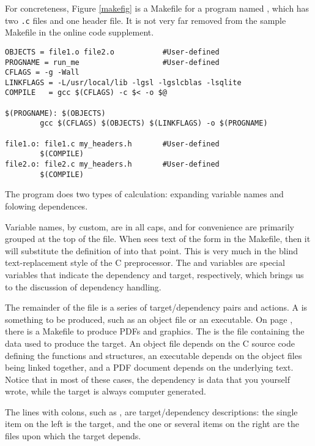 For concreteness, 
Figure \ref{makefig} is a Makefile for a program named ,
which has two {\tt .c} files and one header file. It is not very far
removed from the sample Makefile in the online code supplement.

\begin{figure*}
\begin{verbatim}
OBJECTS = file1.o file2.o           #User-defined
PROGNAME = run_me                   #User-defined
CFLAGS = -g -Wall
LINKFLAGS = -L/usr/local/lib -lgsl -lgslcblas -lsqlite
COMPILE   = gcc $(CFLAGS) -c $< -o $@

$(PROGNAME): $(OBJECTS)
        gcc $(CFLAGS) $(OBJECTS) $(LINKFLAGS) -o $(PROGNAME)

file1.o: file1.c my_headers.h       #User-defined
        $(COMPILE)
file2.o: file2.c my_headers.h       #User-defined
        $(COMPILE)
\end{verbatim}
\caption{A sample Makefile for a program with two source files.}
\label{makefig}
\end{figure*}

The  program does two types of calculation: expanding variable
names and folowing dependences. 

Variable names, by custom, are in all caps, and for convenience are
primarily grouped at the top of the file. When  sees text of
the form  in the Makefile, then it will substitute the
definition of  into that point. This is very much in the
blind text-replacement style of the C preprocessor. The \ci{\$<} and
 variables are special variables that indicate the dependency
and target, respectively, which brings us to the discussion of
dependency handling.

The remainder of the file is a series of target/dependency pairs and
actions. A  is something to be produced, such as an object
file or an executable. On page \pageref{latexmake}, there is a Makefile
to produce PDFs and graphics. The  is the file
containing the data used to produce the target. An object file depends
on the C source code defining the functions and structures, an
executable depends on the object files being linked together, and a PDF
document depends on the underlying text. Notice that in most of these
cases, the dependency is data that you yourself wrote, while the target is
always computer generated. 

The lines with colons, such as , are
target/dependency descriptions: the single item on the left is the
target, and the one or several items on the right are the files upon
which the target depends.

